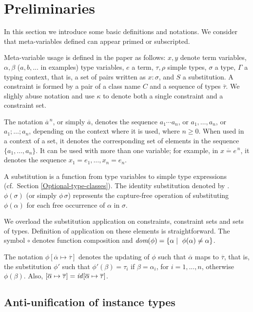 \section{Preliminaries}\label{prelimirares}

In this section we introduce some basic definitions and notations. We
consider that meta-variables defined can appear primed or subscripted.

Meta-variable usage is defined in the paper as follows: $x,y$ denote
term variables, $\alpha, \beta$ ($a, b,...$
in examples) type variables, $e$ a term,
$\tau,\rho$ simple types, $\sigma$ a type, $\Gamma$ a typing context, 
that is, a set of pairs written as $x:\sigma$, and $S$ a
substitution. A constraint is formed by a pair of a class name $C$ and
a sequence of types $\overline{\tau}$. We slighly abuse notation and 
use $\kappa$ to denote both a single constraint and a constraint set.

The notation $\overline{a}^{\,n}$, or simply $\overline{a}$, denotes
the sequence $a_1 \cdots a_n$, or $a_1, \ldots, a_n$, or
$a_1;\ldots;a_n$, depending on the context where it is used, where
$n\geq 0$. When used in a context of a set, it denotes the
corresponding set of elements in the sequence $\{a_1,\ldots,a_n\}$. It
can be used with more than one variable; for example, in $\overline{x
  = e}^{\,n}$, it denotes the sequence $x_1 = e_1, \ldots, x_n = e_n$.

A substitution is a function from type variables to simple type
expressions (cf.~Section \ref{Optional-type-classes}). The identity
substitution denoted by \id. $\phi(\sigma)$ (or simply $\phi\,\sigma$)
represents the capture-free operation of substituting $\phi(\alpha)$
for each free occurrence of $\alpha$ in $\sigma$.

We overload the substitution application on constraints, constraint
sets and sets of types. Definition of application on these elements is
straightforward. The symbol $\circ$ denotes function composition and
$\textit{dom}(\phi)=\{\alpha \mid\ \phi(\alpha) \neq \alpha\}$.

The notation $\phi[\overline{\alpha}\mapsto\overline{\tau}]$ denotes
the updating of $\phi$ such that $\overline{\alpha}$ maps to
$\overline{\tau}$, that is, the substitution $\phi'$ such that
$\phi'(\beta) = \tau_i$ if $\beta = \alpha_i$, for $i = 1,...,n$,
otherwise $\phi(\beta)$. Also, $[\overline{\alpha}\mapsto\overline{\tau}]
= \text{\it id\/}[\overline{\alpha}\mapsto\overline{\tau}]$.

\subsection{Anti-unification of instance types}
\label{sec:anti-unif}

